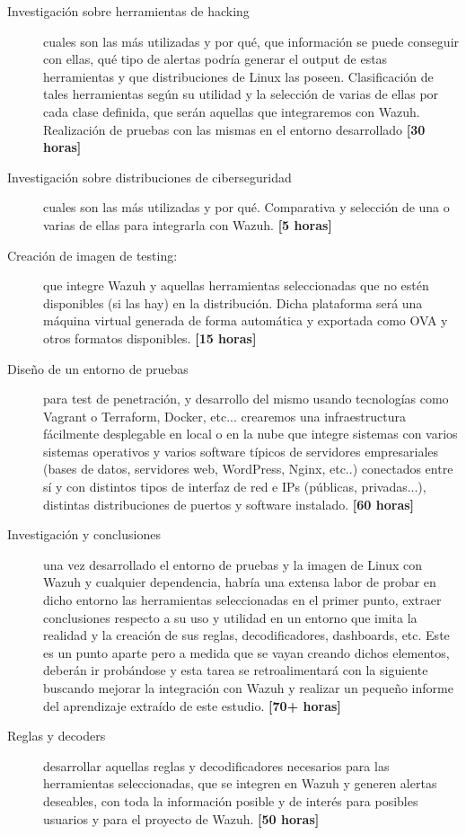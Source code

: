 \begin{description}
    \item [Investigación sobre herramientas de hacking] cuales son las más utilizadas y por qué, que información se puede conseguir con ellas, qué tipo de alertas podría generar el output de estas herramientas y que distribuciones de Linux las poseen. Clasificación de tales herramientas según su utilidad y la selección de varias de ellas por cada clase definida, que serán aquellas que integraremos con Wazuh. Realización de pruebas con las mismas en el entorno desarrollado \textbf{[30 horas]}
    \item [Investigación sobre distribuciones de ciberseguridad] cuales son las más utilizadas y por qué. Comparativa y selección de una o varias de ellas para integrarla con Wazuh. \textbf{[5 horas]}
    \item [Creación de imagen de testing:] que integre Wazuh y aquellas herramientas seleccionadas que no estén disponibles (si las hay) en la distribución. Dicha plataforma será una máquina virtual generada de forma automática y exportada como OVA y otros formatos disponibles. \textbf{[15 horas]}
    \item [Diseño de un entorno de pruebas] para test de penetración, y desarrollo del mismo usando tecnologías como Vagrant o Terraform, Docker, etc... crearemos una infraestructura fácilmente desplegable en local o en la nube  que integre sistemas con varios sistemas operativos y varios software típicos de servidores empresariales (bases de datos, servidores web, WordPress, Nginx, etc..) conectados entre sí y con distintos tipos de interfaz de red e IPs (públicas, privadas...), distintas distribuciones de puertos y software instalado. \textbf{[60 horas]}
    \item [Investigación y conclusiones] una vez desarrollado el entorno de pruebas y la imagen de Linux con Wazuh y cualquier dependencia, habría una extensa labor de probar en dicho entorno las herramientas seleccionadas en el primer punto, extraer conclusiones respecto a su uso y utilidad en un entorno que imita la realidad y la creación de sus reglas, decodificadores, dashboards, etc. Este es un punto aparte pero a medida que se vayan creando dichos elementos, deberán ir probándose y  esta tarea se retroalimentará con la siguiente buscando mejorar la integración con Wazuh y realizar un pequeño informe del aprendizaje extraído de este estudio. \textbf{[70+ horas]}
    \item [Reglas y decoders] desarrollar aquellas reglas y decodificadores necesarios para las herramientas seleccionadas, que se integren en Wazuh y generen alertas deseables, con toda la información posible y de interés para posibles usuarios y para el proyecto de Wazuh. \textbf{[50 horas]}

\end{description}
